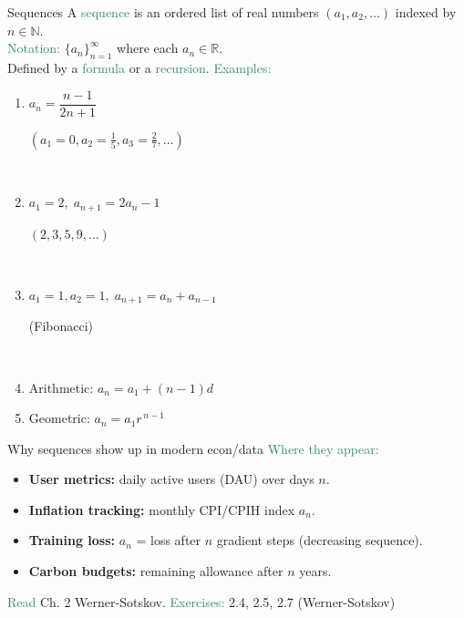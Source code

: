 \documentclass[10pt]{beamer}
\begin{document}
\begin{frame}{Sequences }
%
A \textcolor{SeaGreen}{sequence} is an ordered list of real numbers $(a_1,a_2,\ldots)$ indexed by $n\in\mathbb{N}$. \\[3mm]

\textcolor{SeaGreen}{Notation:} $\{a_n\}_{n=1}^{\infty}$ where each $a_n\in\mathbb{R}$.\\[6pt]
Defined by a \textcolor{SeaGreen}{formula} or a \textcolor{SeaGreen}{recursion}.
\vskip 10pt
\textcolor{SeaGreen}{Examples:} 
\begin{enumerate}
\item $a_n=\dfrac{n-1}{2n+1}$\quad  \begin{small}$(a_1=0, a_2=\frac15,a_3=\frac27,\ldots)$ \end{small}\\[3mm]
\item $a_1=2, \; a_{n+1}=2a_n-1$\quad  \begin{small}$(2,3,5,9,\ldots)$ \end{small}\\[3mm]
\item $a_1=1, a_2=1, \; a_{n+1}=a_n+a_{n-1}$\quad  \begin{small}(Fibonacci)\end{small}\\[3mm]
\item \alert{Arithmetic}: $a_{n}=a_1+(n-1)d$\\[3mm]
\item \alert{Geometric}: $a_n=a_1 r^{\,n-1}$
\end{enumerate}
%
\end{frame}

\begin{frame}{Why sequences show up in modern econ/data}
%
\textcolor{SeaGreen}{Where they appear:}
\begin{itemize}
\item \textbf{User metrics:} daily active users (DAU) over days $n$.\\[3mm]
\item \textbf{Inflation tracking:} monthly CPI/CPIH index $a_n$.\\[3mm]
\item \textbf{Training loss:} $a_n$ = loss after $n$ gradient steps (decreasing sequence).\\[3mm]
\item \textbf{Carbon budgets:} remaining allowance after $n$ years.\\[6mm]
\end{itemize}
\textcolor{SeaGreen}{Read} Ch. 2 Werner-Sotskov.\quad
\textcolor{SeaGreen}{Exercises:} 2.4, 2.5, 2.7 (Werner-Sotskov)
%
\end{frame}
\end{document}
